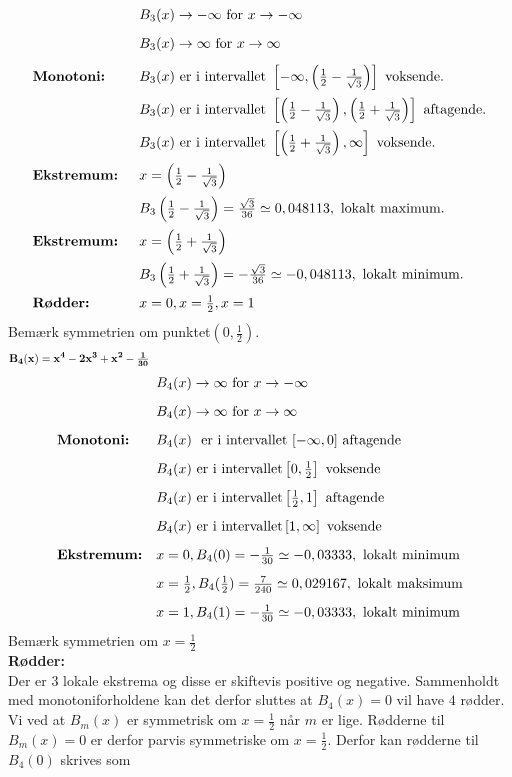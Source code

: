 \begin{equation*}
\begin{array}{ll}
			&B_{3}(x) \rightarrow -\infty \text{ for } x \rightarrow -\infty\nylinie
			&B_{3}(x) \rightarrow \infty \text{ for } x \rightarrow \infty\nylinie
\textbf{Monotoni:}	&B_{3}(x) \text{ er i intervallet } \left[-\infty,\left(\tfrac{1}{2}-\tfrac{1}{\sqrt{3}}\right)\right ] \text{ voksende.}\nylinie
			&B_{3}(x) \text{ er i intervallet } \left[\left(\tfrac{1}{2}-\tfrac{1}{\sqrt{3}}\right),\left(\tfrac{1}{2}+\tfrac{1}{\sqrt{3}}\right)\right] \text{ aftagende.}\nylinie
			&B_{3}(x) \text{ er i intervallet } \left[\left(\tfrac{1}{2}+\tfrac{1}{\sqrt{3}}\right),\infty\right] \text{ voksende.}\nylinie
\textbf{Ekstremum: } 	&x=\left(\tfrac{1}{2}-\tfrac{1}{\sqrt{3}}\right)\nylinie
			& B_{3}\left(\tfrac{1}{2}-\tfrac{1}{\sqrt{3}}\right)=\tfrac{\sqrt{3}}{36} \simeq 0,048113, \text{ lokalt maximum.}\nylinie
\textbf{Ekstremum: } 	&x=\left(\tfrac{1}{2}+\tfrac{1}{\sqrt{3}}\right)\nylinie
			& B_{3}\left(\tfrac{1}{2}+\tfrac{1}{\sqrt{3}}\right)=-\tfrac{\sqrt{3}}{36} \simeq -0,048113, \text{ lokalt minimum.}\nylinie
\textbf{Rødder: }	&x = 0, x = \tfrac{1}{2}, x = 1
\end{array}
\end{equation*}
Bemærk symmetrien om punktet\(\left(0,\frac{1}{2}\right)\).
\[\mathbf{B_{4}(x)=x^{4}-2x^{3}+x^{2}-\tfrac{1}{30}} \MinLinie\] 
\begin{equation*}
\begin{array}{ll}
			&B_{4}(x) \rightarrow \infty \text{ for } x \rightarrow -\infty \nylinie
			&B_{4}(x) \rightarrow \infty \text{ for } x \rightarrow \infty \nylinie
\textbf{Monotoni:} 	&B_{4}(x)\)  \text{ er i intervallet} \([-\infty,0]  \text{ aftagende} \nylinie
			&B_{4}(x)  \text{ er i intervallet} \left[0,\tfrac{1}{2}\right]  \text{ voksende} \nylinie
			&B_{4}(x)  \text{ er i intervallet}\left [\tfrac{1}{2},1\right]  \text{ aftagende} \nylinie
			&B_{4}(x)  \text{ er i intervallet} \left[1,\infty\right]  \text{ voksende} \nylinie
\textbf{Ekstremum:}	&x =0,  B_{4}(0)=-\tfrac{1}{30} \simeq -0,03333 ,   \text{ lokalt minimum} \nylinie
			&x =\tfrac{1}{2},  B_{4}(\tfrac{1}{2})=\tfrac{7}{240} \simeq 0,029167,   \text{ lokalt maksimum} \nylinie
			&x =1,  B_{4}(1)=-\tfrac{1}{30} \simeq -0,03333 ,  \text{  lokalt minimum} 
\end{array}
\end{equation*}
Bemærk symmetrien om \(x=\frac{1}{2}\)\\
\textbf{Rødder:}\\
Der er \(3\) lokale ekstrema og disse er skiftevis positive og negative. Sammenholdt med monotoniforholdene kan det derfor sluttes at \(B_{4}(x)=0\) vil have \(4\) rødder. Vi ved at \(B_{m}(x)\) er symmetrisk om \(x=\frac{1}{2}\) når \(m\) er lige. Rødderne til \(B_{m}(x)=0\) er derfor parvis symmetriske om \(x=\frac{1}{2}\). Derfor kan rødderne til \(B_{4}(0)\) skrives som 

